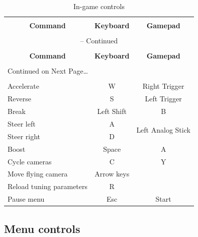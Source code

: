 \documentclass[11pt]{article}
\begin{document}
\begin{center}
\begin{longtable}{lcc}
\caption{In-game controls} \label{ingame-controls-table} \\

\hline \hline \\[-2ex]
   \multicolumn{1}{c}{\textbf{Command}} &
   \multicolumn{1}{c}{\textbf{Keyboard}} &
   \multicolumn{1}{c}{\textbf{Gamepad}} \\[0.5ex] \hline
   \\[-1.8ex]
\endfirsthead

\multicolumn{3}{c}{{\tablename} \thetable{} -- Continued} \\[0.5ex]
  \hline \hline \\[-2ex]
  \multicolumn{1}{c}{\textbf{Command}} &
  \multicolumn{1}{c}{\textbf{Keyboard}} &
  \multicolumn{1}{c}{\textbf{Gamepad}} \\[0.5ex] \hline
  \\[-1.8ex]
\endhead

  \multicolumn{3}{l}{{Continued on Next Page\ldots}} \\
\endfoot

  \\[-1.8ex] \hline \hline
\endlastfoot

Accelerate & W & Right Trigger \\ 
Reverse & S & Left Trigger \\
Break & Left Shift & B \\ 
Steer left & A & \multirow{2}{*}{Left Analog Stick} \\ 
Steer right & D \\
Boost & Space & A \\
Cycle cameras & C & Y \\
Move flying camera & Arrow keys &  \\
Reload tuning parameters & R & \\
Pause menu & Esc & Start \\
\end{longtable}
\end{center}

\subsection{Menu controls}
\end{document}
